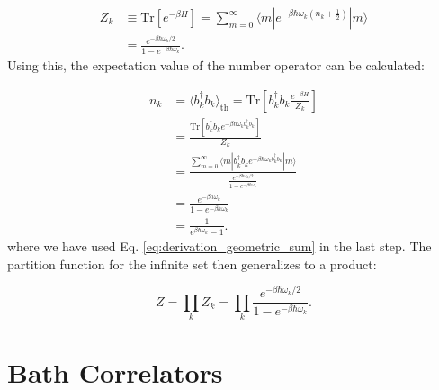 \begin{align} \label{eq:partition_function}
	Z_k & \equiv \mathrm{Tr}\left[e^{-\beta H}\right] = \sum_{m=0}^{\infty} \langle m | e^{-\beta \hbar \omega_k (n_k + \frac{1}{2})} | m \rangle \\
	    & = \frac{e^{-\beta \hbar \omega_k / 2}}{1 - e^{-\beta \hbar \omega_k}}.
\end{align}
Using this, the expectation value of the number operator can be calculated:

\begin{align} \label{eq:expectation_number_operator}
	n_k & = \langle b_k^{\dagger} b_k \rangle_{\text{th}} = \mathrm{Tr} \left[ b_k^{\dagger} b_k \frac{e^{-\beta H}}{Z_k} \right]                                                             \\
	    & = \frac{\mathrm{Tr} \left[ b_k^{\dagger} b_k e^{-\beta \hbar \omega_k b_k^{\dagger} b_k} \right]}{Z_k}                                                                              \\
	    & = \frac{\sum_{m=0}^{\infty} \langle m|b_k^{\dagger} b_k e^{-\beta \hbar \omega_k b_k^{\dagger} b_k}|m \rangle}{\frac{e^{-\beta \hbar \omega_k / 2}}{1 - e^{-\beta \hbar \omega_k}}} \\
	    & = \frac{e^{-\beta \hbar \omega_k}}{1 - e^{-\beta \hbar \omega_k}}                                                                                                                   \\
	    & = \frac{1}{e^{\beta \hbar \omega_k} - 1}.
\end{align}
where we have used Eq. \eqref{eq:derivation_geometric_sum} in the last step.
The partition function for the infinite set then generalizes to a product:

\begin{equation} \label{eq:generalized_partition_function}
	Z = \prod_k Z_k = \prod_k \frac{e^{-\beta \hbar \omega_k / 2}}{1 - e^{-\beta \hbar \omega_k}}.
\end{equation}

\section{Bath Correlators}
\label{sec:bath_corr_trans_rates}

